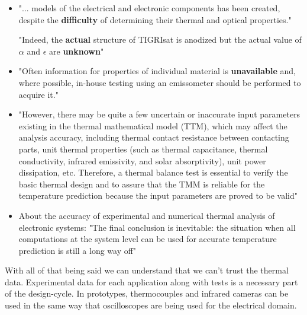 \documentclass[final]{cubedoc}
\begin{document}
	\begin{itemize}
		\item "... models of the electrical and electronic components has been created, despite the \textbf{difficulty} of determining their thermal and optical properties." 
		
		"Indeed, the \textbf{actual} structure of TIGRIsat is anodized but the actual value of $\alpha$  and $\epsilon$ are \textbf{unknown}" \cite{paris2015}
		
		\item "Often information for properties of individual material is \textbf{unavailable} and, where possible, in-house testing using an emissometer should be performed to acquire it." \cite{mccarron2018developing}
		
		
		\item "However, there may be quite a few uncertain or inaccurate input parameters existing in the thermal mathematical model (TTM), which may affect the analysis accuracy, including thermal contact resistance between contacting parts, unit thermal properties (such as thermal capacitance, thermal conductivity, infrared emissivity, and solar absorptivity), unit power dissipation, etc. Therefore, a thermal balance test is essential to verify the basic thermal design and to assure that the TMM is reliable for the temperature prediction because the input parameters are proved to be valid" \cite{tsai2004overview}
		
		
		
		\item About the accuracy of experimental and numerical thermal analysis of electronic systems: "The final conclusion is inevitable: the situation when all computations at the system level can be used for accurate temperature prediction is still a long way off" \cite{lasance2002}
	\end{itemize}
	
	With all of that being said we can understand that we can't trust the thermal data. Experimental data for each application along with tests is a necessary part of the design-cycle. In prototypes, thermocouples and infrared cameras can be used in the same way that oscilloscopes are being used for the electrical domain.
	
\end{document}
